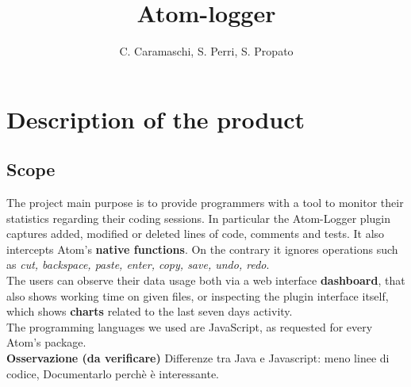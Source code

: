 \documentclass[a4paper,10pt]{report}
\title{Atom-logger}
\author{C. Caramaschi, S. Perri, S. Propato}
\begin{document}
\maketitle
\tableofcontents

\newpage
\chapter{Description of the product}
\section{Scope}

The project main purpose is to provide programmers with a tool to monitor their statistics regarding their coding sessions.
	In particular the Atom-Logger plugin captures added, modified or deleted lines of code, comments and tests. It also intercepts Atom's \textbf{native functions}. On the contrary it ignores operations such as \emph{cut, backspace, paste, enter, copy, save, undo, redo}.\\
	The users can observe their data usage both via a web interface \textbf{dashboard}, that also shows working time on given files, or inspecting the plugin interface itself, which shows \textbf{charts} related to the last seven days activity.\\
The programming languages we used are JavaScript, as requested for every Atom's package.\\
\textbf{Osservazione (da verificare)} Differenze tra Java e Javascript: meno linee di codice, Documentarlo perchè è interessante.\\
\end{document}
